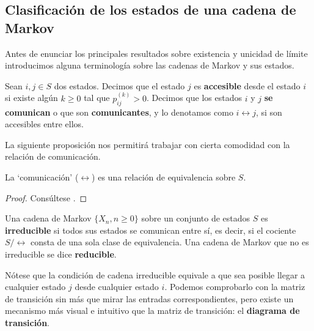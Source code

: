 \subsection{Clasificación de los estados de una cadena de Markov}

Antes de enunciar los principales resultados sobre existencia y unicidad de límite introducimos alguna terminología sobre las cadenas de Markov y sus estados.

\begin{definicion}
    Sean $i,j\in S$ dos estados. Decimos que el estado $j$ es \textbf{accesible} desde el estado $i$ si existe algún $k\geq 0$ tal que $p_{ij}^{(k)}>0$. Decimos que los estados $i$ y $j$ \textbf{se comunican} o que son  \textbf{comunicantes}, y lo denotamos como $i\leftrightarrow j$, si son accesibles entre ellos.
\end{definicion}

La siguiente proposición nos permitirá trabajar con cierta comodidad con la relación de comunicación.

\begin{proposicion}
    La `comunicación' ($\leftrightarrow$) es una relación de equivalencia sobre $S$.
\end{proposicion}
\begin{proof}
    Consúltese \cite[Proposition 4.2.1]{Ross}.
\end{proof}

\begin{definicion}
    Una cadena de Markov $\{X_n,n\geq 0\}$ sobre un conjunto de estados $S$ es \textbf{irreducible} si todos sus estados se comunican entre sí, es decir, si el cociente $S/\leftrightarrow$ consta de una sola clase de equivalencia. Una cadena de Markov que no es irreducible se dice \textbf{reducible}.
\end{definicion}

Nótese que la condición de cadena irreducible equivale a que sea posible llegar a cualquier estado $j$ desde cualquier estado $i$. Podemos comprobarlo con la matriz de transición sin más que mirar las entradas correspondientes, pero existe un mecanismo más visual e intuitivo que la matriz de transición: el \textbf{diagrama de transición}.

